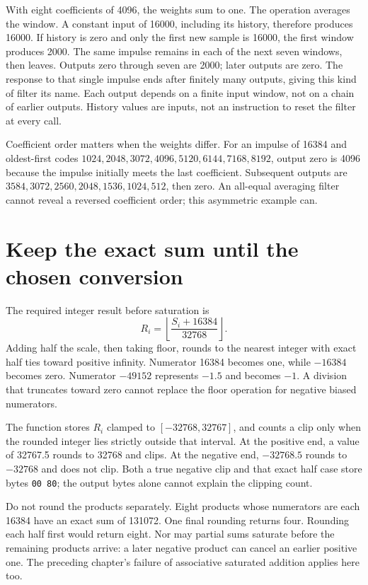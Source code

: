 With eight coefficients of 4096, the weights sum to one. The operation averages
the window. A constant input of 16000, including its history, therefore produces
16000. If history is zero and only the first new sample is 16000, the first
window produces 2000. The same impulse remains in each of the next seven windows,
then leaves. Outputs zero through seven are 2000; later outputs are zero.
The response to that single impulse ends after finitely many outputs, giving
this kind of filter its name. Each output depends on a finite input window,
not on a chain of earlier outputs. History values are inputs, not an instruction
to reset the filter at every call.



Coefficient order matters when the weights differ. For an impulse of 16384 and
oldest-first codes $1024,2048,3072,4096,5120,6144,7168,8192$, output zero is
4096 because the impulse initially meets the last coefficient. Subsequent outputs
are $3584,3072,2560,2048,1536,1024,512$, then zero. An all-equal averaging filter
cannot reveal a reversed coefficient order; this asymmetric example can.

\section{Keep the exact sum until the chosen conversion}

The required integer result before saturation is
\[
  R_i=\left\lfloor\frac{S_i+16384}{32768}\right\rfloor.
\]
Adding half the scale, then taking floor, rounds to the nearest integer with
exact half ties toward positive infinity. Numerator 16384 becomes one, while
$-16384$ becomes zero. Numerator $-49152$ represents $-1.5$ and becomes $-1$.
A division that truncates toward zero cannot replace the floor operation for
negative biased numerators.

The function stores $R_i$ clamped to $[-32768,32767]$, and counts a clip only
when the rounded integer lies strictly outside that interval. At the positive
end, a value of 32767.5 rounds to 32768 and clips. At the negative end,
$-32768.5$ rounds to $-32768$ and does not clip. Both a true negative clip and
that exact half case store bytes \texttt{00 80}; the output bytes alone cannot
explain the clipping count.

Do not round the products separately. Eight products whose numerators are each
16384 have an exact sum of 131072. One final rounding returns four. Rounding
each half first would return eight. Nor may partial sums saturate before the
remaining products arrive: a later negative product can cancel an earlier
positive one. The preceding chapter's failure of associative saturated addition
applies here too.


